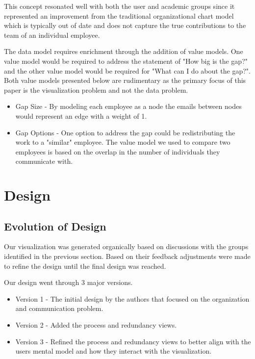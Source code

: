 \documentclass[journal]{vgtc}                %
\begin{document}
This concept resonated well with both the user and academic groups since it represented an improvement from the traditional organizational chart model which is typically out of date and does not capture the true contributions to the team of an individual employee.

The data model requires enrichment through the addition of value models.  One value model would be required to address the statement of "How big is the gap?" and the other value model would be required for "What can I do about the gap?".  Both value models presented below are rudimentary as the primary focus of this paper is the visualization problem and not the data problem.

\begin{itemize}
\item Gap Size - By modeling each employee as a node the emails between nodes would represent an edge with a weight of 1.
\item Gap Options - One option to address the gap could be redistributing the work to a "similar" employee. The value model we used to compare two employees is based on the overlap in the number of individuals they communicate with. 
\end{itemize}

\section{Design}

\subsection{Evolution of Design}
Our visualization was generated organically based on discussions with the groups identified in the previous section.  Based on their feedback adjustments were made to refine the design until the final design was reached.

Our design went through 3 major versions.
\begin{itemize}
	\item Version 1 - The initial design by the authors that focused on the organization and communication problem.
	\item Version 2 - Added the process and redundancy views.
	\item Version 3 - Refined the process and redundancy views to better align with the users mental model and how they interact with the visualization.
\end{itemize}
\end{document}
